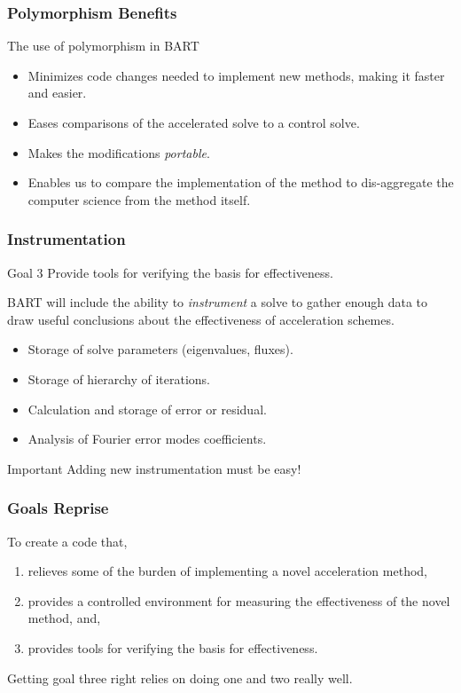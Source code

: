 \documentclass[xcolor=x11names, compress, handout]{beamer}
\begin{document}
\begin{frame}
  \frametitle{Polymorphism Benefits}
  The use of polymorphism in BART
  \begin{itemize}
  \item<1-> Minimizes code changes needed to implement new methods,
    making it faster and easier.
  \item<2-> Eases comparisons of the accelerated solve to a
    control solve.
  \item<3-> Makes the modifications \textit{portable}.    
  \item<4-> Enables us to compare the implementation of the method to
    dis-aggregate the computer science from the method itself.
  \end{itemize}

\end{frame}
\begin{frame}
  \frametitle{Instrumentation}
  \pause
  \begin{block}{Goal 3}
    Provide tools for verifying the basis for effectiveness.
  \end{block}
  \pause
  BART will include the ability to \textit{instrument} a solve
  to gather enough data to draw useful conclusions about the effectiveness of
  acceleration schemes.
  \pause
\begin{itemize}
  \item Storage of solve parameters (eigenvalues, fluxes).
  \item Storage of hierarchy of iterations.
  \item Calculation and storage of error or residual.
  \item Analysis of Fourier error modes coefficients.
  \end{itemize}
\pause
  \begin{block}{Important}
    Adding new instrumentation must be easy!
  \end{block}
\end{frame}
\begin{frame}
  \frametitle{Goals Reprise}
  To create a code that, 
  \vspace{1em}
  \begin{enumerate}
    \setlength\itemsep{1em}
  \item relieves some of the burden of implementing a novel acceleration method,
  \item provides a controlled environment for measuring the
    effectiveness of the novel method, and,
  \item provides tools for verifying the basis for effectiveness.
  \end{enumerate}
  \pause
  \begin{block}{}
    Getting goal three right relies on doing one and two really well.
  \end{block}
\end{frame}
\end{document}
